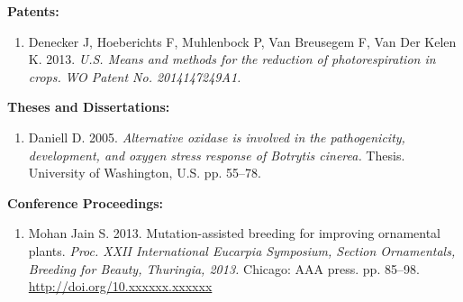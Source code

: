 \documentclass[12pt,a4paper]{article}
\begin{document}
\textbf{Patents:}

\begin{enumerate}
\renewcommand{\labelenumi}{[\theenumi].}
\setcounter{enumi}{6}
    \item Denecker J, Hoeberichts F, Muhlenbock P, Van Breusegem F, Van Der Kelen K. 2013. \textit{U.S. Means and methods for the reduction of photorespiration in crops.} \textit{WO Patent No. 2014147249A1.}
\end{enumerate}

\textbf{Theses and Dissertations:}

\begin{enumerate}
\renewcommand{\labelenumi}{[\theenumi].}
\setcounter{enumi}{7}
    \item Daniell D. 2005. \textit{Alternative oxidase is involved in the pathogenicity, development, and oxygen stress response of Botrytis cinerea.} Thesis. University of Washington, U.S. pp. 55--78.
\end{enumerate}

\textbf{Conference Proceedings:}

\begin{enumerate}
\renewcommand{\labelenumi}{[\theenumi].}
\setcounter{enumi}{8}
    \item Mohan Jain S. 2013. Mutation-assisted breeding for improving ornamental plants. \textit{Proc. XXII International Eucarpia Symposium, Section Ornamentals, Breeding for Beauty, Thuringia, 2013.} Chicago: AAA press. pp. 85--98. \url{http://doi.org/10.xxxxxx.xxxxxx}
\end{enumerate}
\end{document}

